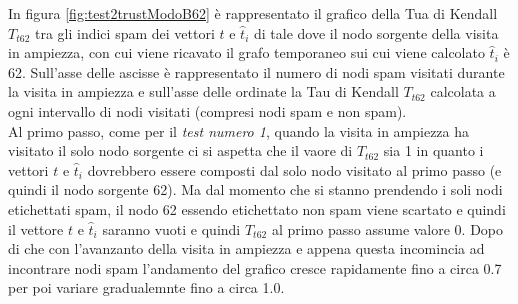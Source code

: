 In figura \ref{fig:test2trustModoB62} è rappresentato il grafico della Tua di Kendall \(T_{t62}\) tra gli indici spam dei vettori \(t\) e \(\hat{t}_i\)  di tale dove il nodo sorgente della visita in ampiezza, con cui viene ricavato il grafo temporaneo sui cui viene calcolato \(\hat{t}_i\) è 62. Sull'asse delle ascisse è rappresentato il numero di nodi spam visitati durante la visita in ampiezza e sull'asse delle ordinate la Tau di Kendall \(T_{t62}\) calcolata a ogni intervallo di nodi visitati (compresi nodi spam e non spam).\\
Al primo passo, come per il \textit{test numero 1}, quando la visita in ampiezza ha visitato il solo nodo sorgente ci si aspetta che il vaore di \(T_{t62}\) sia  1 in quanto i vettori \(t\) e \(\hat{t}_i\) dovrebbero essere composti dal solo nodo visitato al primo passo (e quindi il nodo sorgente 62).  Ma dal momento che si stanno prendendo i soli nodi etichettati spam, il nodo 62 essendo etichettato non spam  viene scartato e quindi il vettore \(t\) e \(\hat{t}_i\) saranno vuoti e quindi \(T_{t62}\) al primo passo assume valore 0. Dopo di che con l'avanzanto della visita in ampiezza e appena questa incomincia ad incontrare nodi spam l'andamento del grafico cresce rapidamente fino a circa 0.7 per poi variare gradualemnte fino a circa 1.0.

